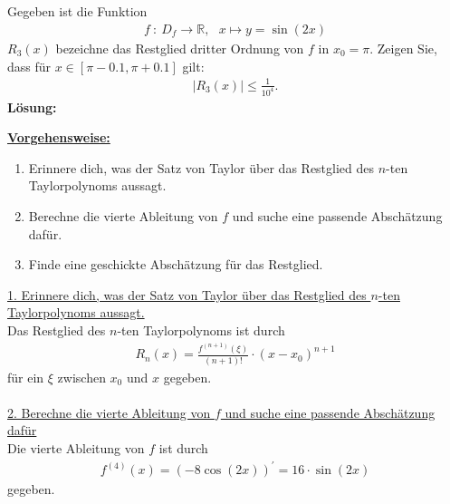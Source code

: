 \newpage

\subsection*{}
Gegeben ist die Funktion
\begin{align*}
f \ : \ D_f \to \mathbb{R}, \ \ \
x \mapsto y = \sin(2x) 
\end{align*}
$R_3(x)$ bezeichne das Restglied dritter Ordnung von $f$ in $x_0= \pi$.
Zeigen Sie, dass für $x \in [\pi -0.1, \pi+0.1]$ gilt:
\begin{align*}
|R_3(x)| \leq \frac{1}{10^4}.
\end{align*}
\textbf{Lösung:}
\begin{mdframed}
\underline{\textbf{Vorgehensweise:}}
\begin{enumerate}
\item Erinnere dich, was der Satz von Taylor über das Restglied des $n$-ten Taylorpolynoms aussagt. 
\item Berechne die vierte Ableitung von $f$ und suche eine passende Abschätzung dafür.
\item Finde eine geschickte Abschätzung für das Restglied. 
\end{enumerate}
\end{mdframed}

\underline{1. Erinnere dich, was der Satz von Taylor über das Restglied des $n$-ten Taylorpolynoms aussagt.}\\
Das Restglied des $n$-ten Taylorpolynoms ist durch
\begin{align*}
R_n(x) = \frac{f^{(n+1)}(\xi)}{(n+1)!}\cdot (x -x_0)^{n+1}
\end{align*}
für ein  $\xi$ zwischen $x_0$ und $x$ gegeben.\\
\\

\underline{2. Berechne die vierte Ableitung von $f$ und suche eine passende Abschätzung dafür}\\
Die vierte Ableitung von $f$ ist durch
\begin{align*}
f^{(4)}(x) =(-8 \cos(2x))^\prime = 16 \cdot \sin(2x)
\end{align*}
gegeben.\\
\\

